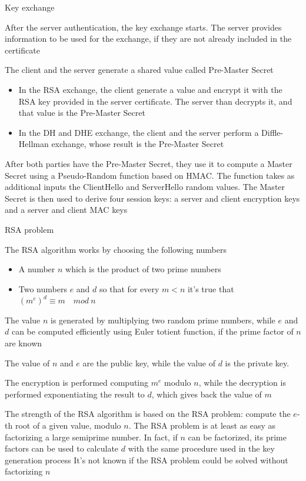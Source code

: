 \begin{frame}{Key exchange}
	
After the server authentication, the key exchange starts. The server provides information to be used for the exchange, if they are not already included in the certificate


The client and the server generate a shared value called Pre-Master Secret

\begin{itemize}
	\item In the RSA exchange, the client generate a value and encrypt it with the RSA key provided in the server certificate. The server than decrypts it, and that value is the Pre-Master Secret
	\item In the DH and DHE exchange, the client and the server perform a Diffle-Hellman exchange, whose result is the Pre-Master Secret
\end{itemize}
	
After both parties have the Pre-Master Secret, they use it to compute a Master Secret using a Pseudo-Random function based on HMAC. The function takes as additional inputs the ClientHello and ServerHello random values. 
The Master Secret is then used to derive four session keys: a server and client encryption keys and a server and client MAC keys
	
\end{frame}

\begin{frame}{RSA problem}
	
The RSA algorithm works by choosing the following numbers

\begin{itemize}
	\item A number $n$ which is the product of two prime numbers
	\item Two numbers $e$ and $d$ so that for every $m < n$ it's true that $(m^e)^d \equiv m \quad mod ~ n$
\end{itemize}
	
The value $n$ is generated by multiplying two random prime numbers, while $e$ and $d$ can be computed efficiently using Euler totient function, if the prime factor of $n$ are known

The value of $n$ and $e$ are the public key, while the value of $d$ is the private key.

The encryption is performed computing $m^e$ modulo $n$, while the decryption is performed exponentiating the result to $d$, which gives back the value of $m$

The strength of the RSA algorithm is based on the RSA problem: compute the $e$-th root of a given value, modulo $n$. The RSA problem is at least as easy as factorizing a large semiprime number.
In fact, if $n$ can be factorized, its prime factors can be used to calculate $d$ with the same procedure used in the key generation process
\newline
It's not known if the RSA problem could be solved without factorizing $n$
	
\end{frame}

